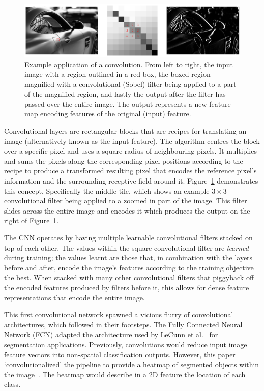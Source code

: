 \documentclass[11pt,twoside]{report}
\begin{document}
\begin{figure}[H]
  \centering
  \includegraphics[width=1\linewidth]{../figures/sobel.png}
  \caption{Example application of a convolution. From left to right, the input image with a region outlined in a red box, the boxed region magnified with a convolutional (Sobel) filter being applied to a part of the magnified region, and lastly the output after the filter has passed over the entire image. The output represents a new feature map encoding features of the original (input) feature.}\label{fig:sobel}
\end{figure}

Convolutional layers are rectangular blocks that are recipes for translating an image (alternatively known as the input feature). The algorithm centres the block over a specific pixel and uses a square radius of neighbouring pixels. It multiplies and sums the pixels along the corresponding pixel positions according to the recipe to produce a transformed resulting pixel that encodes the reference pixel's information and the surrounding receptive field around it. Figure~\ref{fig:sobel} demonstrates this concept. Specifically the middle tile, which shows an example $3 \times 3$ convolutional filter being applied to a zoomed in part of the image. This filter slides across the entire image and encodes it which produces the output on the right of Figure~\ref{fig:sobel}. 

The CNN operates by having multiple learnable convolutional filters stacked on top of each other. The values within the square convolutional filter are \textit{learned} during training; the values learnt are those that, in combination with the layers before and after, encode the image's features according to the training objective the best. When stacked with many other convolutional filters that piggyback off the encoded features produced by filters before it, this allows for dense feature representations that encode the entire image.


This first convolutional network spawned a vicious flurry of convolutional architectures, which followed in their footsteps. The Fully Connected Neural Network (FCN) adapted the architecture used by LeCunn et al.~\cite{Lenet1998} for segmentation applications. Previously, convolutions would reduce input image feature vectors into non-spatial classification outputs. However, this paper `convolutionalized' the pipeline to provide a heatmap of segmented objects within the image~\cite{fully-CNNs-for-semantic-segmentation}. The heatmap would describe in a 2D feature the location of each class.
\end{document}
